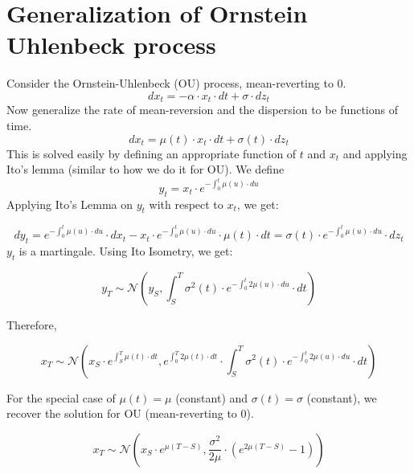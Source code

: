 \documentclass[10pt]{amsart}
\begin{document}
\section{Generalization of Ornstein Uhlenbeck process}
Consider the Ornstein-Uhlenbeck (OU) process, mean-reverting to 0.
$$dx_t = -\alpha \cdot x_t \cdot dt + \sigma \cdot dz_t$$
Now generalize the rate of mean-reversion and the dispersion to be functions of time.
$$dx_t = \mu(t) \cdot x_t \cdot dt + \sigma(t) \cdot dz_t$$
This is solved easily by defining an appropriate function of $t$ and $x_t$ and applying Ito's lemma (similar to how we do it for OU). We define
$$y_t = x_t \cdot e^{-\int_0^t \mu(u) \cdot du}$$
Applying Ito's Lemma on $y_t$ with respect to $x_t$, we get:

$$dy_t = e^{-\int_0^t \mu(u) \cdot du} \cdot dx_t - x_t \cdot e^{-\int_0^t \mu(u) \cdot du} \cdot  \mu(t) \cdot dt = \sigma(t) \cdot e^{-\int_0^t \mu(u) \cdot du} \cdot dz_t$$
$y_t$ is a martingale. Using Ito Isometry, we get:

$$y_T \sim \mathcal{N}(y_S, \int_S^T \sigma^2(t) \cdot e^{-\int_0^t 2 \mu(u) \cdot du} \cdot dt)$$

Therefore,

$$x_T \sim \mathcal{N}(x_S \cdot e^{\int_S^T \mu(t) \cdot dt}, e^{\int_0^T 2\mu(t) \cdot dt} \cdot \int_S^T \sigma^2(t) \cdot e^{-\int_0^t 2 \mu(u) \cdot du} \cdot dt)$$

For the special case of $\mu(t) = \mu$ (constant) and $\sigma(t) = \sigma$ (constant), we recover the solution for OU (mean-reverting to 0).

$$x_T \sim \mathcal{N}(x_S \cdot e^{\mu (T-S)}, \frac {\sigma^2} {2 \mu} \cdot (e^{2 \mu (T-S)} - 1))$$
\end{document}
